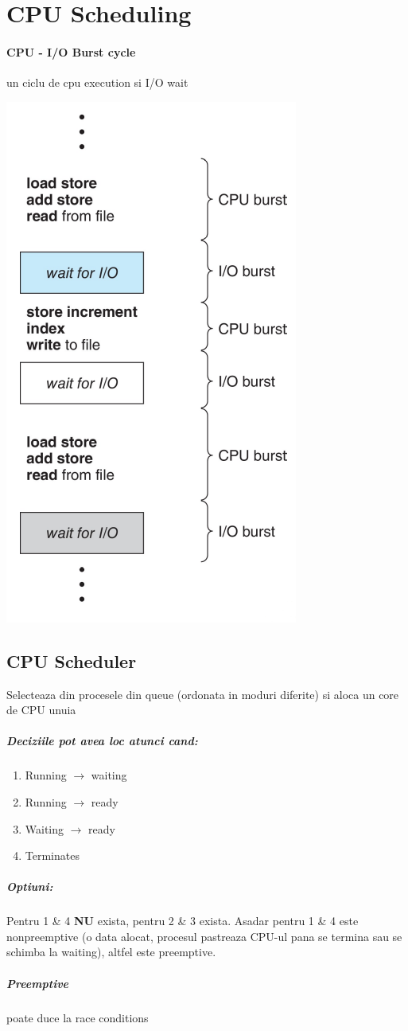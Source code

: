 \documentclass{article}
\begin{document}
\section[Ch5 CPU Scheduling]{CPU Scheduling}
\paragraph*{CPU - I/O Burst cycle} un ciclu de cpu execution si I/O wait

\begin{center}
    \includegraphics[scale=0.3]{11_cpuioburstcycle.png}
\end{center}

\subsection*{CPU Scheduler} Selecteaza din procesele din queue (ordonata in moduri diferite) si aloca un core de CPU unuia
\subparagraph*{Deciziile pot avea loc atunci cand:}
\begin{enumerate}
    \item Running $\rightarrow$ waiting
    \item Running $\rightarrow$ ready
    \item Waiting $\rightarrow$ ready
    \item Terminates
\end{enumerate}
\subparagraph*{Optiuni:} Pentru 1 \& 4 \textbf{NU} exista, pentru 2 \& 3 exista. Asadar pentru 1 \& 4 este nonpreemptive (o data alocat, procesul pastreaza CPU-ul pana se termina sau se schimba la waiting), altfel este preemptive.
\subparagraph*{Preemptive} poate duce la race conditions
\end{document}
